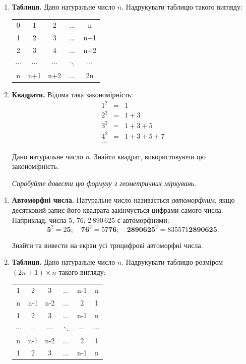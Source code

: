 \begin{enumerate}
\item \textbf{Таблиця.} Дано натуральне число $n$. Надрукувати таб\-ли\-цю такого вигляду:
{\ttfamily
\begin{center}
\setlength{\tabcolsep}{6pt}
\begin{tabular}{ccccc}
0 & 1 & 2 & $\ldots$ & n \\
1 & 2 & 3 & $\ldots$ & n+1 \\
2 & 3 & 4 & $\ldots$ & n+2 \\
$\cdots$ & $\cdots$ & $\cdots$ & $\ddots$ & $\cdots$ \\
n & n+1 & n+2 & $\ldots$ & 2n
\end{tabular}
\end{center}
}
\item \textbf{Квадрати.} Відома така закономірність:
$$
\begin{array}{lcl}
1^2 & = & 1\\
2^2 & = & 1+3\\
3^2 & = & 1+3+5\\
4^2 & = & 1+3+5+7\\
\ldots &
\end{array}
$$

Дано натуральне число $n$. Знайти квадрат, використовуючи цю закономірність.

{\itshape *Спробуйте довести цю формулу з геометричних міркувань.}
\end{enumerate}

 


\begin{enumerate}
\item \textbf{Автоморфні числа.} Натуральне число називається {\itshape автоморфним}, якщо десятковий запис його квадрата закінчується цифрами самого числа. Наприклад, числа 5, 76, 2\,890\,625 є автоморфними:
$$
\mathbf{5}^2=2\mathbf{5}; \quad \mathbf{76}^2=57\mathbf{76}; \quad \mathbf{2890625}^2=835571\mathbf{2890625}.
$$

Знайти та вивести на екран усі трицифрові автоморфні числа.
\item \textbf{Таблиця.} Дано натуральне число $n$. Надрукувати таблицю розміром \\$(2n+1)\times n$ такого вигляду:
{\ttfamily
\begin{center}
\setlength{\tabcolsep}{6pt}
\begin{tabular}{cccccc}
1 & 2 & 3 & $\ldots$ & n-1 & n \\
n & n-1 & n-2 & $\ldots$ & 2 & 1 \\
1 & 2 & 3 & $\ldots$ & n-1 & n  \\
$\cdots$ & $\cdots$ & $\cdots$ & $\ddots$ & $\cdots$ & $\cdots$ \\
n & n-1 & n-2 & $\ldots$ & 2 & 1 \\
1 & 2 & 3 & $\ldots$ & n-1 & n
\end{tabular}
\end{center}
}
\end{enumerate}

